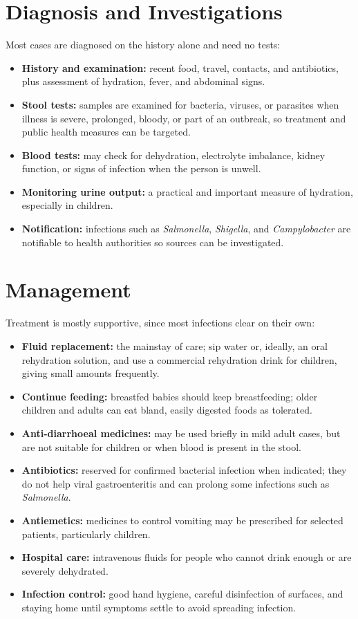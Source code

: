\section*{Diagnosis and Investigations}
Most cases are diagnosed on the history alone and need no tests:
\begin{itemize}
    \item \textbf{History and examination:} recent food, travel, contacts, and antibiotics, plus assessment of hydration, fever, and abdominal signs.
    \item \textbf{Stool tests:} samples are examined for bacteria, viruses, or parasites when illness is severe, prolonged, bloody, or part of an outbreak, so treatment and public health measures can be targeted.
    \item \textbf{Blood tests:} may check for dehydration, electrolyte imbalance, kidney function, or signs of infection when the person is unwell.
    \item \textbf{Monitoring urine output:} a practical and important measure of hydration, especially in children.
    \item \textbf{Notification:} infections such as \textit{Salmonella}, \textit{Shigella}, and \textit{Campylobacter} are notifiable to health authorities so sources can be investigated.
\end{itemize}

\section*{Management}
Treatment is mostly supportive, since most infections clear on their own:
\begin{itemize}
    \item \textbf{Fluid replacement:} the mainstay of care; sip water or, ideally, an oral rehydration solution, and use a commercial rehydration drink for children, giving small amounts frequently.
    \item \textbf{Continue feeding:} breastfed babies should keep breastfeeding; older children and adults can eat bland, easily digested foods as tolerated.
    \item \textbf{Anti-diarrhoeal medicines:} may be used briefly in mild adult cases, but are not suitable for children or when blood is present in the stool.
    \item \textbf{Antibiotics:} reserved for confirmed bacterial infection when indicated; they do not help viral gastroenteritis and can prolong some infections such as \textit{Salmonella}.
    \item \textbf{Antiemetics:} medicines to control vomiting may be prescribed for selected patients, particularly children.
    \item \textbf{Hospital care:} intravenous fluids for people who cannot drink enough or are severely dehydrated.
    \item \textbf{Infection control:} good hand hygiene, careful disinfection of surfaces, and staying home until symptoms settle to avoid spreading infection.
\end{itemize}

